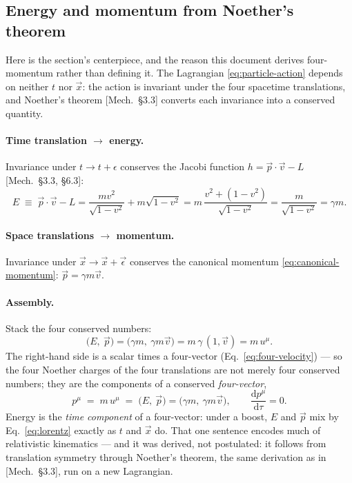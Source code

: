 \documentclass[11pt]{article}
\theoremstyle{plain}
\theoremstyle{definition}
\theoremstyle{remark}
\newcommand{\dd}{\mathrm{d}}
\newcommand{\tot}[2]{\frac{\dd #1}{\dd #2}}
\newcommand{\vx}{\vec{x}}
\newcommand{\vv}{\vec{v}}
\newcommand{\vp}{\vec{p}}
\begin{document}
\subsection{Energy and momentum from Noether's theorem}
\label{sec:particle-noether}

Here is the section's centerpiece, and the reason this document
derives four-momentum rather than defining it. The Lagrangian
\eqref{eq:particle-action} depends on neither $t$ nor $\vx$: the
action is invariant under the four spacetime translations, and
Noether's theorem [Mech.\ \S3.3] converts each invariance into a
conserved quantity.

\paragraph{Time translation $\to$ energy.} Invariance under
$t \to t + \epsilon$ conserves the Jacobi function
$h = \vp \cdot \vv - L$ [Mech.\ \S3.3, \S6.3]:
\begin{equation}
  E \;\equiv\; \vp\cdot\vv - L
  = \frac{m v^2}{\sqrt{1-v^2}} + m\sqrt{1-v^2}
  = m\,\frac{v^2 + (1 - v^2)}{\sqrt{1-v^2}}
  = \frac{m}{\sqrt{1-v^2}}
  = \gamma m .
  \label{eq:energy}
\end{equation}

\paragraph{Space translations $\to$ momentum.} Invariance under
$\vx \to \vx + \vec\epsilon$ conserves the canonical momentum
\eqref{eq:canonical-momentum}: $\vp = \gamma m \vv$.

\paragraph{Assembly.} Stack the four conserved numbers:
\begin{equation}
  \bigl(E,\ \vp\bigr)
  = \bigl(\gamma m,\ \gamma m \vv\bigr)
  = m\,\gamma\,(1, \vv)
  = m\, u^\mu .
\end{equation}
The right-hand side is a scalar times a four-vector
(Eq.~\eqref{eq:four-velocity}) --- so the four Noether charges of the
four translations are not merely four conserved numbers; they are the
components of a conserved \emph{four-vector},
\begin{equation}
  \boxed{\;
  p^\mu \;=\; m\,u^\mu \;=\; \bigl(E,\ \vp\bigr)
  = \bigl(\gamma m,\ \gamma m \vv\bigr),
  \qquad
  \tot{p^\mu}{\tau} = 0 .
  \;}
  \label{eq:four-momentum}
\end{equation}
Energy is the \emph{time component} of a four-vector: under a boost,
$E$ and $\vp$ mix by Eq.~\eqref{eq:lorentz} exactly as $t$ and $\vx$
do. That one sentence encodes much of relativistic kinematics ---
and it was derived, not postulated: it follows from translation
symmetry through Noether's theorem, the same derivation as in
[Mech.\ \S3.3], run on a new Lagrangian.
\end{document}
